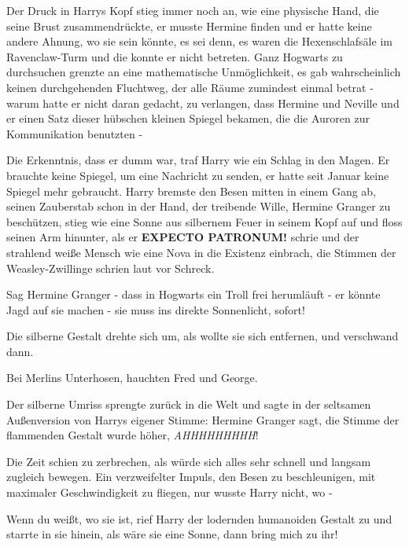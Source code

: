 Der Druck in Harrys Kopf stieg immer noch an, wie eine physische Hand, die seine
Brust zusammendrückte, er musste Hermine finden und er hatte keine andere
Ahnung, wo sie sein könnte, es sei denn, es waren die Hexenschlafsäle im
Ravenclaw-Turm und die konnte er nicht betreten. Ganz Hogwarts zu durchsuchen
grenzte an eine mathematische Unmöglichkeit, es gab wahrscheinlich keinen
durchgehenden Fluchtweg, der alle Räume zumindest einmal betrat - warum hatte er
nicht daran gedacht, zu verlangen, dass Hermine und Neville und er einen Satz
dieser hübschen kleinen Spiegel bekamen, die die Auroren zur Kommunikation
benutzten -

Die Erkenntnis, dass er dumm war, traf Harry wie ein Schlag in den Magen. Er
brauchte keine Spiegel, um eine Nachricht zu senden, er hatte seit Januar keine
Spiegel mehr gebraucht. Harry bremste den Besen mitten in einem Gang ab, seinen
Zauberstab schon in der Hand, der treibende Wille, Hermine Granger zu
beschützen, stieg wie eine Sonne aus silbernem Feuer in seinem Kopf auf und
floss seinen Arm hinunter, als er \glqq{}\textbf{EXPECTO PATRONUM!}\grqq{} schrie
und der strahlend weiße Mensch wie eine Nova in die Existenz einbrach, die
Stimmen der Weasley-Zwillinge schrien laut vor Schreck.

\glqq{}Sag Hermine Granger - dass in Hogwarts ein Troll frei herumläuft - er
könnte Jagd auf sie machen - sie muss ins direkte Sonnenlicht, sofort!\grqq{}

Die silberne Gestalt drehte sich um, als wollte sie sich entfernen, und
verschwand dann.

\glqq{}Bei Merlins Unterhosen\grqq{}, hauchten Fred und George.

Der silberne Umriss sprengte zurück in die Welt und sagte in der seltsamen
Außenversion von Harrys eigener Stimme: \glqq{}Hermine Granger sagt\grqq{}, die
Stimme der flammenden Gestalt wurde höher, \glqq{}\emph{AHHHHHHHHH}!\grqq{}

Die Zeit schien zu zerbrechen, als würde sich alles sehr schnell und langsam
zugleich bewegen. Ein verzweifelter Impuls, den Besen zu beschleunigen, mit
maximaler Geschwindigkeit zu fliegen, nur wusste Harry nicht, wo -

\glqq{}Wenn du weißt, wo sie ist\grqq{}, rief Harry der lodernden humanoiden
Gestalt zu und starrte in sie hinein, als wäre sie eine Sonne, \glqq{}dann bring
mich zu ihr!\grqq{}


